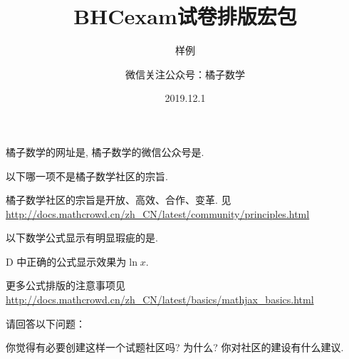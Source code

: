 \documentclass[a4paper,answers]{BHCexam}
\begin{document}
\title{BHCexam试卷排版宏包}

\subtitle{样例}


\author{微信关注公众号：橘子数学}

\date{2019.12.1}

\maketitle

\begin{groups}

\begin{questions}[s]

\question[30] 橘子数学的网址是, 橘子数学的微信公众号是.

\end{questions}

\begin{questions}[s]

\question[30] 以下哪一项不是橘子数学社区的宗旨.

\begin{solution}{4cm}
\method 橘子数学社区的宗旨是开放、高效、合作、变革.
\method 见 \url{http://docs.mathcrowd.cn/zh_CN/latest/community/principles.html}
\end{solution}

\question[40] 以下数学公式显示有明显瑕疵的是.

\begin{solution}{4cm}
\methodonly D 中正确的公式显示效果为$\ln{x}$.

更多公式排版的注意事项见 \url{http://docs.mathcrowd.cn/zh_CN/latest/basics/mathjax_basics.html}
\end{solution}
\end{questions}

\begin{questions}[st]
\question[30] 请回答以下问题：
\begin{subquestions}
    \subquestion 你觉得有必要创建这样一个试题社区吗? 为什么?
    \subquestion 你对社区的建设有什么建议.
\end{subquestions}


\end{questions}
\end{groups}
\end{document}
